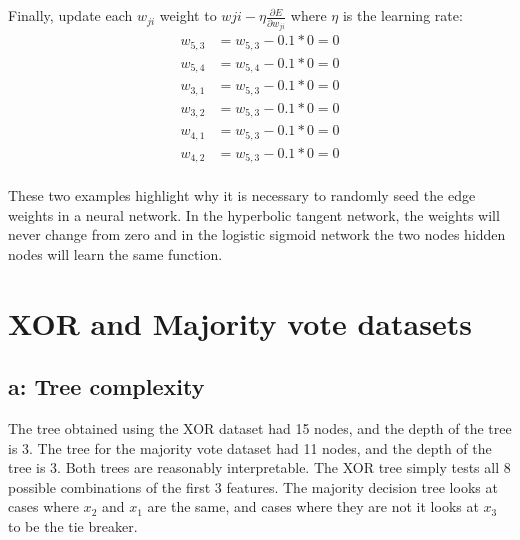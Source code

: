 \documentclass{article}
\begin{document}
\\
\\
Finally, update each $w_{ji}$ weight to $w{ji} - \eta \frac{\partial E}{\partial w_{ji}}$ where $\eta$ is the learning rate:
\begin{align*}
 w_{5,3} &= w_{5,3} - 0.1*0 = 0\\
 w_{5,4} &= w_{5,4} - 0.1*0 = 0\\
 w_{3,1} &= w_{5,3} - 0.1*0 = 0\\
 w_{3,2} &= w_{5,3} - 0.1*0 = 0\\
 w_{4,1} &= w_{5,3} - 0.1*0 = 0\\
 w_{4,2} &= w_{5,3} - 0.1*0 = 0\\
\end{align*}

These two examples highlight why it is necessary to randomly seed the edge weights in a neural network. In the hyperbolic tangent network, the weights will never change from zero and in the logistic sigmoid network the two nodes hidden nodes will learn the same function.

\section{XOR and Majority vote datasets}

\subsection*{a: Tree complexity}
The tree obtained using the XOR dataset had 15 nodes, and the depth of the tree is 3.
The tree for the majority vote dataset had 11 nodes, and the depth of the tree is 3.
Both trees are reasonably interpretable. The XOR tree simply tests all 8 possible combinations of the first 3 features.
The majority decision tree looks at cases where $x_2$ and $x_1$ are the same, and cases where they are not it looks at $x_3$ to be the tie breaker. 

\end{document}
